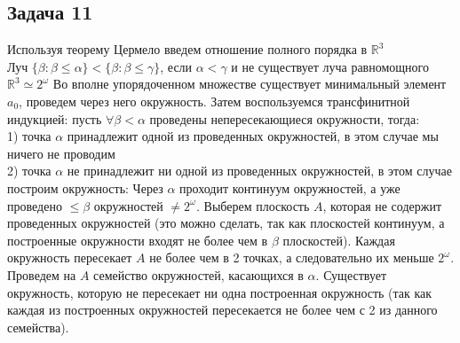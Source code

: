 \subsection*{Задача 11}
	Используя теорему Цермело введем отношение полного порядка в $\mathbb{R}^3$\\
	Луч $\{\beta: \beta \leqslant \alpha\} < \{\beta: \beta \leqslant \gamma\}$, если $\alpha < \gamma$ и не существует луча равномощного $\mathbb{R}^3 \simeq 2^\omega$
	\vskip 0.1in
	Во вполне упорядоченном множестве существует минимальный элемент $a_0$, проведем через него окружность.
	\vskip 0.1in
	Затем воспользуемся трансфинитной индукцией: пусть $\forall \beta < \alpha$ проведены непересекающиеся окружности, тогда:\\
	1) точка $\alpha$ принадлежит одной из проведенных окружностей, в этом случае мы ничего не проводим\\
	2) точка $\alpha$ не принадлежит ни одной из проведенных окружностей, в этом случае построим окружность: Через $\alpha$ проходит континуум окружностей, а уже проведено $\leqslant \beta$ окружностей $\ne 2^{\omega}$. Выберем плоскость $A$, которая не содержит проведенных окружностей (это можно сделать, так как плоскостей континуум, а построенные окружности входят не более чем в $\beta$ плоскостей). Каждая окружность пересекает $A$ не более чем в 2 точках, а следовательно их меньше $2^\omega$. Проведем на $A$ семейство окружностей, касающихся в $\alpha$. Существует окружность, которую не пересекает ни одна построенная окружность (так как каждая из построенных окружностей пересекается не более чем с 2 из данного семейства).
	\begin{comment}
	Пусть $\phi$ -- ординал и $\mathbb{R}^3 = \{p_{\alpha}: \alpha < \phi\}$ будет некоторой нумерацией точек пространства. Определим единичную окружность $C_{\alpha}$, содержащей $p_{\alpha}$, через трансфинитную индукцию на $\alpha$, для некоторых $\alpha$ мы не будем ничего определять. Шаг индукции: пусть мы находимся на шаге $\alpha$ и какие-то окружности $\{C_{\beta}: \beta < \alpha\}$ уже определены. Если некоторые из них покрывают $p_{\alpha}$, мы ничего не добавляем. В противном случае выберем единичную окружность содержащую $p_{\alpha}$, которая не пересекается ни с одной из уже проведенных окружностей, для этого мы сперва выберем плоскость, прорходящую через $p_{\alpha}$ и не совпадающую с плоскостями уже имеющихся окружностей, это возможно, так как через $p_{\alpha}$ проходит континуум плоскостей, и менее чем континуум уже проведен. Пусть мы выбрали некую плоскость $K$, прошлые окружности пересекают $K$ менее чем в континуальном числе точек, и необходимо найти окружность в $K$, которая не проходит через точки уже проведенных окружностей. В $K$ континуум окружностей проходит через $p_{\alpha}$, и каждая из точек уже выбранных окружностей убирает ровно 2 окружности в плоскости $K$, а следовательно в $K$ можно провести окружность, не пересекающуюся ни с одной из уже проведенных.
	\end{comment}

